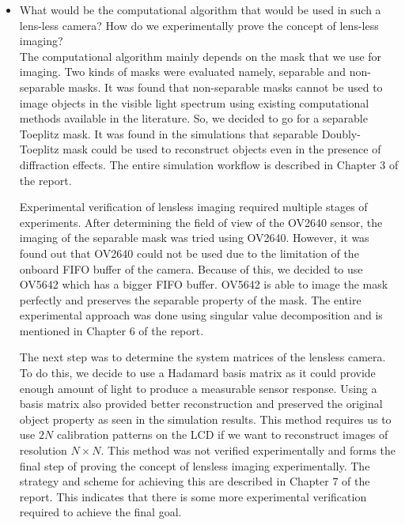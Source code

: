 \begin{itemize}
\item What would be the computational algorithm that would be used in such a lens-less camera? How do we experimentally prove the concept of lens-less imaging?\\
The computational algorithm mainly depends on the mask that we use for imaging. Two kinds of masks were evaluated namely, separable and non-separable masks. It was found that non-separable masks cannot be used to image objects in the visible light spectrum using existing computational methods available in the literature. So, we decided to go for a separable Toeplitz mask. It was found in the simulations that separable Doubly-Toeplitz mask could be used to reconstruct objects even in the presence of diffraction effects. The entire simulation workflow is described in Chapter 3 of the report.

Experimental verification of lensless imaging required multiple stages of experiments. After determining the field of view of the OV2640 sensor, the imaging of the separable mask was tried using OV2640. However, it was found out that OV2640 could not be used due to the limitation of the onboard FIFO buffer of the camera. Because of this, we decided to use OV5642 which has a bigger FIFO buffer. OV5642 is able to image the mask perfectly and preserves the separable property of the mask. The entire experimental approach was done using singular value decomposition and is mentioned in Chapter 6 of the report.  

The next step was to determine the system matrices of the lensless camera. To do this, we decide to use a Hadamard basis matrix as it could provide enough amount of light to produce a measurable sensor response. Using a basis matrix also provided better reconstruction and preserved the original object property as seen in the simulation results. This method requires us to use $2N$ calibration patterns on the LCD if we want to reconstruct images of resolution $N \times N$. This method was not verified experimentally and forms the final step of proving the concept of lensless imaging experimentally. The strategy and scheme for achieving this are described in Chapter 7 of the report. This indicates that there is some more experimental verification required to achieve the final goal.

\end{itemize}

